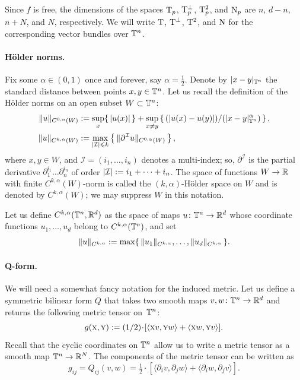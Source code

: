 Since $f$ is free, the dimensions of the spaces $\mathrm{T}_p$, $\mathrm{T}_p^\perp$, $\mathrm{T}^2_p$, and $\operatorname{\rm N}_p$ are $n$, $d - n$, $n + N$, and $N$, respectively.
We will write $\mathrm{T}$, $\mathrm{T}^\perp$, $\mathrm{T}^2$, and $\operatorname{\rm N}$ for the corresponding vector bundles over $\mathbb{T}^n$.
\label{TTTN}

\paragraph{Hölder norms.}
Fix some $\alpha\in(0,1)$ once and forever, say $\alpha=\tfrac12$.
Denote by $|x-y|_{\mathbb{T}^n}$ the standard distance between points $x,y\z\in\TT^n$.
Let us recall the definition of the Hölder norms on an open subset $W\subset \mathbb{T}^n$: \label{C(T)}
\begin{align*}
\|u\|_{C^{0,\alpha}(W)}&\mathrel{:=}\sup_{x}\{\,|u(x)|\,\}+\sup_{x\ne y}\left\{\,(|u(x)-u(y)|)/(|x-y|_{\mathbb{T}^n}^\alpha)\,\right\},
\\
\|u\|_{C^{k,\alpha}(W)}&\mathrel{:=}\max_{|\mathcal{I}|\leqslant k}\left\{\,\|\partial^{\mathcal{I}}u\|_{C^{0,\alpha}(W)}\,\right\},
\end{align*}
where $x,y\in W$, and $\mathcal{I} = (i_1,\dots,i_n)$ denotes a multi-index; so, $\partial^{\mathcal{I}}$ is the partial derivative $\partial_1^{i_1}\dots\partial_n^{i_n}$ of order $|\mathcal{I}| \z\df i_1 +\dots+i_n$.
The space of functions $W\to \mathbb{R}$ with finite ${C^{k,\alpha}(W)}$-norm is called the $(k,\alpha)$-Hölder space on $W$ and is denoted by $C^{k,\alpha}(W)$;  we may suppress $W$ in this notation.

Let us define $C^{k,\alpha}(\mathbb{T}^n,\mathbb{R}^d)$ as the space of maps $u\colon\TT^n\z\to \RR^d$ whose coordinate functions $u_1,\dots, u_d$ belong to $C^{k,\alpha}(\mathbb{T}^n)$,
and set
\[\|u\|_{C^{k,\alpha}}\mathrel{:=}\max \{\,\|u_1\|_{C^{k,\alpha}},\dots,\|u_d\|_{C^{k,\alpha}} \,\}.\]

\paragraph{Q-form.}
We will need a somewhat fancy notation for the induced metric.
Let us define a symmetric bilinear form $Q$\label{Q} that takes two smooth maps $v, w\colon\mathbb{T}^n \to \mathbb{R}^d$ and returns the following metric tensor on~$\mathbb{T}^n$:
\[
g(\vec x, \vec y)
\df
\tfrac{1}{2} \cdot [\langle \vec x v, \vec y w \rangle + \langle \vec x w, \vec y v \rangle].
\]
Recall that the cyclic coordinates on $\mathbb{T}^n$ allow us to write a metric tensor as a smooth map $\mathbb{T}^n\to\mathbb{R}^N$.
The components of the metric tensor can be written as
\[
g_{ij} = Q_{ij}(v, w) = \tfrac{1}{2} \cdot [\langle \partial_i v, \partial_j w \rangle+\langle \partial_i w, \partial_j v \rangle].
\]

